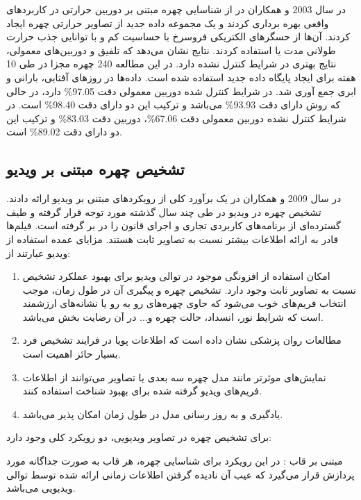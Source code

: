 \noindent
در سال 2003  و همکاران در \cite{SOCOLINSKY200372} از شناسایی چهره مبتنی بر دوربین حرارتی در کاربردهای واقعی بهره برداری کردند و یک مجموعه داده جدید از تصاویر حرارتی چهره ایجاد کردند. آن‌ها از حسگرهای الکتریکی فروسرخ با حساسیت کم و با توانایی جذب حرارت طولانی مدت یا  استفاده کردند.
نتایج نشان می‌دهد که تلفیق  و دوربین‌های معمولی، نتایج بهتری در شرایط کنترل نشده دارد. در این مطالعه 240 چهره مجزا در طی 10 هفته برای ایجاد پایگاه داده جدید استفاده شده است. داده‌ها در روزهای آفتابی، بارانی و ابری جمع آوری شد. در شرایط کنترل شده دوربین معمولی دقت 97.05\% دارد، در حالی که روش  دارای دقت 93.93\% می‌باشد و ترکیب این دو دارای دقت 98.40\% است. در شرایط کنترل نشده دوربین معمولی دقت 67.06\%، دوربین  دقت 83.03\% و ترکیب این دو دارای دقت 89.02\% است.

\subsection{تشخیص چهره مبتنی بر ویدیو}
در سال 2009  و همکاران در \cite{wang2009video} یک برآورد کلی از رویکردهای مبتنی بر ویدیو ارائه دادند. تشخیص چهره در ویدیو در طی چند سال گذشته مورد توجه قرار گرفته و طیف گسترده‌ای از برنامه‌های کاربردی تجاری و اجرای قانون را در بر گرفته است. فیلم‌ها قادر به ارائه اطلاعات بیشتر نسبت به تصاویر ثابت هستند. مزایای عمده استفاده از ویدیو عبارتند از:

\begin{enumerate}
\item
	امکان استفاده از افزونگی موجود در توالی ویدیو برای بهبود عملکرد تشخیص نسبت به تصاویر ثابت وجود دارد. تشخیص چهره و پیگیری آن در طول زمان، موجب انتخاب فریم‌های خوب می‌شود که حاوی چهره‌های رو به رو یا نشانه‌های ارزشمند است که شرایط نور، انسداد، حالت چهره و... در آن رضایت بخش می‌باشد.
\item 
	مطالعات روان پزشکی نشان داده است که اطلاعات پویا در فرایند تشخیص فرد بسیار حائز اهمیت است. 
\item
	نمایش‌های موثرتر مانند مدل چهره سه بعدی یا تصاویر  می‌توانند از اطلاعات فریم‌های ویدیو گرفته شده برای بهبود شناخت استفاده کنند.
\item
	یادگیری و به روز رسانی مدل در طول زمان امکان پذیر می‌باشد.
\end{enumerate}
	
\noindent
برای تشخیص چهره در تصاویر ویدیویی، دو رویکرد کلی وجود دارد:

\noindent
مبتنی بر قاب : در این رویکرد برای شناسایی چهره، هر قاب به صورت جداگانه مورد پردازش قرار می‌گیرد که عیب آن نادیده گرفتن اطلاعات زمانی ارائه شده توسط توالی ویدیویی می‌باشد. 

